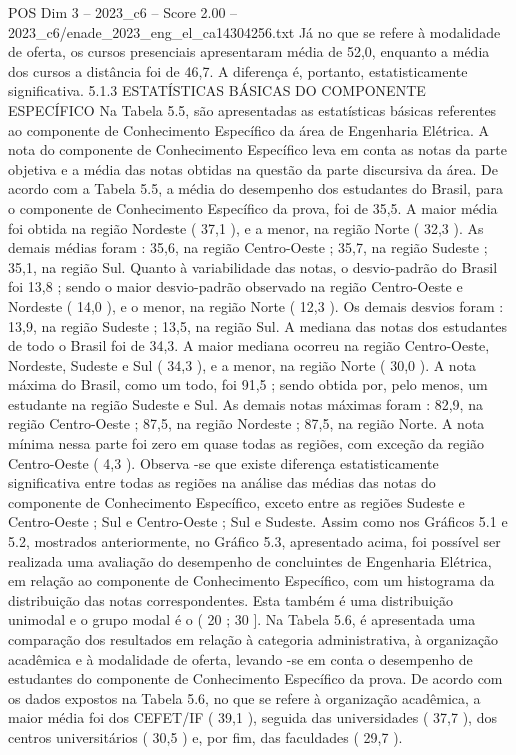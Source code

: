 \begin{textsample}{POS Dim 3 – 2023\_c6 – Score 2.00 – 2023\_c6/enade\_2023\_eng\_el\_ca14304256.txt}
Já no que se refere à modalidade de oferta, os cursos presenciais apresentaram média de 52,0, enquanto a média dos cursos a distância foi de 46,7.
A diferença é, portanto, estatisticamente significativa. 5.1.3 ESTATÍSTICAS BÁSICAS DO COMPONENTE ESPECÍFICO Na Tabela 5.5, são apresentadas as estatísticas básicas referentes ao componente de Conhecimento Específico da área de Engenharia Elétrica.
A nota do componente de Conhecimento Específico leva em conta as notas da parte objetiva e a média das notas obtidas na questão da parte discursiva da área.
De acordo com a Tabela 5.5, a média do desempenho dos estudantes do Brasil, para o componente de Conhecimento Específico da prova, foi de 35,5.
A maior média foi obtida na região Nordeste ( 37,1 ), e a menor, na região Norte ( 32,3 ).
As demais médias foram : 35,6, na região Centro-Oeste ; 35,7, na região Sudeste ; 35,1, na região Sul.
Quanto à variabilidade das notas, o desvio-padrão do Brasil foi 13,8 ; sendo o maior desvio-padrão observado na região Centro-Oeste e Nordeste ( 14,0 ), e o menor, na região Norte ( 12,3 ).
Os demais desvios foram : 13,9, na região Sudeste ; 13,5, na região Sul.
A mediana das notas dos estudantes de todo o Brasil foi de 34,3.
A maior mediana ocorreu na região Centro-Oeste, Nordeste, Sudeste e Sul ( 34,3 ), e a menor, na região Norte ( 30,0 ).
A nota máxima do Brasil, como um todo, foi 91,5 ; sendo obtida por, pelo menos, um estudante na região Sudeste e Sul.
As demais notas máximas foram : 82,9, na região Centro-Oeste ; 87,5, na região Nordeste ; 87,5, na região Norte.
A nota mínima nessa parte foi zero em quase todas as regiões, com exceção da região Centro-Oeste ( 4,3 ).
Observa -se que existe diferença estatisticamente significativa entre todas as regiões na análise das médias das notas do componente de Conhecimento Específico, exceto entre as regiões Sudeste e Centro-Oeste ; Sul e Centro-Oeste ; Sul e Sudeste.
Assim como nos Gráficos 5.1 e 5.2, mostrados anteriormente, no Gráfico 5.3, apresentado acima, foi possível ser realizada uma avaliação do desempenho de concluintes de Engenharia Elétrica, em relação ao componente de Conhecimento Específico, com um histograma da distribuição das notas correspondentes.
Esta também é uma distribuição unimodal e o grupo modal é o ( 20 ; 30 ].
Na Tabela 5.6, é apresentada uma comparação dos resultados em relação à categoria administrativa, à organização acadêmica e à modalidade de oferta, levando -se em conta o desempenho de estudantes do componente de Conhecimento Específico da prova.
De acordo com os dados expostos na Tabela 5.6, no que se refere à organização acadêmica, a maior média foi dos CEFET/IF ( 39,1 ), seguida das universidades ( 37,7 ), dos centros universitários ( 30,5 ) e, por fim, das faculdades ( 29,7 ).

\end{textsample}
